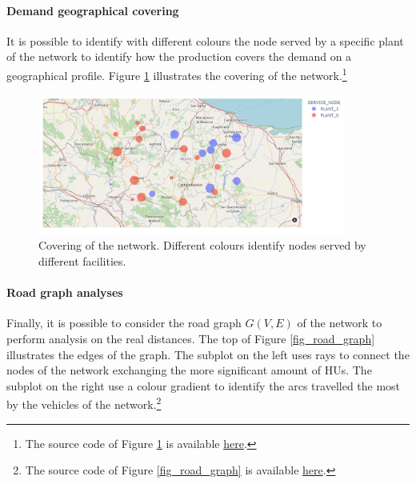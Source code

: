 \paragraph{Demand geographical covering}
It is possible to identify with different colours the node served by a specific plant of the network to identify how the production covers the demand on a geographical profile. Figure \ref{fig_graph_covering} illustrates the covering of the network.\footnote{The source code of Figure \ref{fig_graph_covering} is available \href{https://github.com/aletuf93/logproj/blob/master/examples/DIST_02\%20Location\%20assessment.ipynb}{here}.}

\begin{figure}[hbt!]
\centering
\includegraphics[width=0.9\textwidth]{SectionDistribution/control_figures/fig_graph_covering.png}
\captionsetup{type=figure}
\caption{Covering of the network. Different colours identify nodes served by different facilities.}
\label{fig_graph_covering}
\end{figure}

\paragraph{Road graph analyses}
Finally, it is possible to consider the road graph $G(V,E)$ of the network to perform analysis on the real distances. The top of Figure \ref{fig_road_graph} illustrates the edges of the graph. The subplot on the left uses rays to connect the nodes of the network exchanging the more significant amount of HUs. The subplot on the right use a colour gradient to identify the arcs travelled the most by the vehicles of the network.\footnote{The source code of Figure \ref{fig_road_graph} is available \href{https://github.com/aletuf93/logproj/blob/master/examples/DIST_02\%20Location\%20assessment.ipynb}{here}.}

